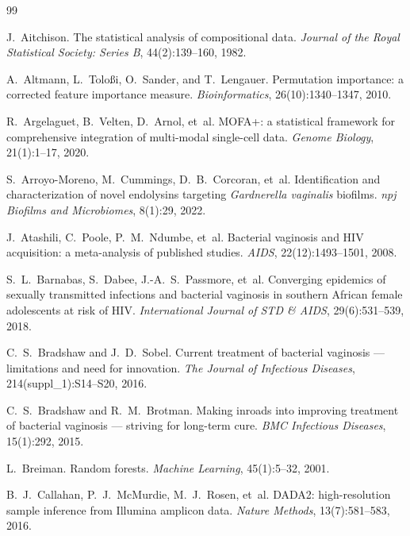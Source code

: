 \documentclass[12pt,a4paper]{report}
\begin{document}
\begin{thebibliography}{99}

J.~Aitchison.
\newblock The statistical analysis of compositional data.
\newblock \textit{Journal of the Royal Statistical Society: Series B}, 44(2):139--160, 1982.

A.~Altmann, L.~Tolo\ss i, O.~Sander, and T.~Lengauer.
\newblock Permutation importance: a corrected feature importance measure.
\newblock \textit{Bioinformatics}, 26(10):1340--1347, 2010.

R.~Argelaguet, B.~Velten, D.~Arnol, et~al.
\newblock MOFA+: a statistical framework for comprehensive integration of multi-modal single-cell data.
\newblock \textit{Genome Biology}, 21(1):1--17, 2020.

S.~Arroyo-Moreno, M.~Cummings, D.~B.~Corcoran, et~al.
\newblock Identification and characterization of novel endolysins targeting \textit{Gardnerella vaginalis} biofilms.
\newblock \textit{npj Biofilms and Microbiomes}, 8(1):29, 2022.

J.~Atashili, C.~Poole, P.~M.~Ndumbe, et~al.
\newblock Bacterial vaginosis and HIV acquisition: a meta-analysis of published studies.
\newblock \textit{AIDS}, 22(12):1493--1501, 2008.

S.~L.~Barnabas, S.~Dabee, J.-A.~S.~Passmore, et~al.
\newblock Converging epidemics of sexually transmitted infections and bacterial vaginosis in southern African female adolescents at risk of HIV.
\newblock \textit{International Journal of STD \& AIDS}, 29(6):531--539, 2018.

C.~S.~Bradshaw and J.~D.~Sobel.
\newblock Current treatment of bacterial vaginosis --- limitations and need for innovation.
\newblock \textit{The Journal of Infectious Diseases}, 214(suppl\_1):S14--S20, 2016.

C.~S.~Bradshaw and R.~M.~Brotman.
\newblock Making inroads into improving treatment of bacterial vaginosis --- striving for long-term cure.
\newblock \textit{BMC Infectious Diseases}, 15(1):292, 2015.

L.~Breiman.
\newblock Random forests.
\newblock \textit{Machine Learning}, 45(1):5--32, 2001.

B.~J.~Callahan, P.~J.~McMurdie, M.~J.~Rosen, et~al.
\newblock DADA2: high-resolution sample inference from Illumina amplicon data.
\newblock \textit{Nature Methods}, 13(7):581--583, 2016.


\end{thebibliography}
\end{document}
